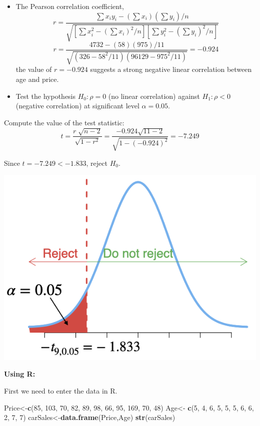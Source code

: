 \documentclass[
]{article}
\newenvironment{Shaded}{\begin{snugshade}}{\end{snugshade}}
\newcommand{\DecValTok}[1]{\textcolor[rgb]{0.00,0.00,0.81}{#1}}
\newcommand{\FunctionTok}[1]{\textcolor[rgb]{0.13,0.29,0.53}{\textbf{#1}}}
\newcommand{\NormalTok}[1]{#1}
\newcommand{\OtherTok}[1]{\textcolor[rgb]{0.56,0.35,0.01}{#1}}
\begin{document}
\begin{itemize}
\item
  The Pearson correlation coefficient,
  \[r=\frac{\sum x_i y_i - (\sum x_i) (\sum y_i)/n }{\sqrt{ [\sum x^2_{i} -(\sum x_i)^2/n] [\sum y^2_{i} -(\sum y_i)^2/n] } } \]
  \[r=\frac{4732-(58)(975)/11}{\sqrt{(326-58^2/11)( 96129-975^2/11)}}=-0.924\]
  the value of \(r=-0.924\) suggests a strong negative linear
  correlation between age and price.
\item
  Test the hypothesis \(H_0: \rho = 0\) (no linear correlation) against
  \(H_1: \rho < 0\) (negative correlation) at significant level
  \(\alpha=0.05\).
\end{itemize}

Compute the value of the test statistic:
\[t=\frac{r\; \sqrt{n-2} }{\sqrt{1-r^{2} } }=\frac{-0.924\sqrt{11-2}}{\sqrt{1-(-0.924)^2}}=-7.249  \]

Since \(t=-7.249<-1.833\), reject \(H_0\).

\begin{center}\includegraphics[width=0.35\linewidth,height=0.35\textheight]{figures/correx1} \end{center}

\textbf{Using R:}

First we need to enter the data in R.

\begin{Shaded}
\begin{Highlighting}[]
\NormalTok{Price}\OtherTok{\textless{}{-}}\FunctionTok{c}\NormalTok{(}\DecValTok{85}\NormalTok{, }\DecValTok{103}\NormalTok{,  }\DecValTok{70}\NormalTok{,  }\DecValTok{82}\NormalTok{,  }\DecValTok{89}\NormalTok{,  }\DecValTok{98}\NormalTok{,  }\DecValTok{66}\NormalTok{,  }\DecValTok{95}\NormalTok{, }\DecValTok{169}\NormalTok{,  }\DecValTok{70}\NormalTok{,  }\DecValTok{48}\NormalTok{)}
\NormalTok{Age}\OtherTok{\textless{}{-}} \FunctionTok{c}\NormalTok{(}\DecValTok{5}\NormalTok{, }\DecValTok{4}\NormalTok{, }\DecValTok{6}\NormalTok{, }\DecValTok{5}\NormalTok{, }\DecValTok{5}\NormalTok{, }\DecValTok{5}\NormalTok{, }\DecValTok{6}\NormalTok{, }\DecValTok{6}\NormalTok{, }\DecValTok{2}\NormalTok{, }\DecValTok{7}\NormalTok{, }\DecValTok{7}\NormalTok{)}
\NormalTok{carSales}\OtherTok{\textless{}{-}}\FunctionTok{data.frame}\NormalTok{(Price,Age)}
\FunctionTok{str}\NormalTok{(carSales)}
\end{Highlighting}
\end{Shaded}
\end{document}
